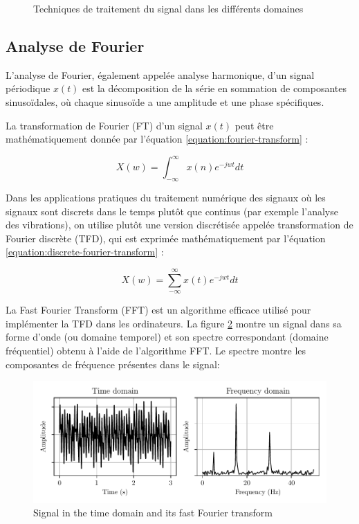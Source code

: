 \begin{figure}[h]
    \centering
	
    \caption{Techniques de traitement du signal dans les différents domaines}
    \label{fig:signal-processing}
\end{figure}


\subsection{Analyse de Fourier}
L'analyse de Fourier, également appelée analyse harmonique, d'un signal périodique $x(t)$ est la décomposition de la série en sommation de composantes sinusoïdales, où chaque sinusoïde a une amplitude et une phase spécifiques.

La transformation de Fourier (FT) d'un signal $x(t)$ peut être mathématiquement donnée par l'équation \ref{equation:fourier-transform} :

\begin{equation}
    X(w) = \int_{-\infty}^{\infty}x(n)e^{-jwt}dt
    \label{equation:fourier-transform}
\end{equation}

Dans les applications pratiques du traitement numérique des signaux où les signaux sont discrets dans le temps plutôt que continus (par exemple l'analyse des vibrations), on utilise plutôt une version discrétisée appelée transformation de Fourier discrète (TFD), qui est exprimée mathématiquement par l'équation \ref{equation:discrete-fourier-transform} :

\begin{equation}
    X(w) = \sum_{-\infty}^{\infty}x(t)e^{-jwt}dt
    \label{equation:discrete-fourier-transform}
\end{equation}

La Fast Fourier Transform (FFT) est un algorithme efficace utilisé pour implémenter la TFD dans les ordinateurs. La figure \ref{figure:fft} montre un signal dans sa forme d'onde (ou domaine temporel) et son spectre correspondant (domaine fréquentiel) obtenu à l'aide de l'algorithme FFT. Le spectre montre les composantes de fréquence présentes dans le signal:

\begin{figure}[h]
    \centering
    \includegraphics{figures/fft.pdf}
    \caption{Signal in the time domain and its fast Fourier transform}
    \label{figure:fft}
\end{figure}


